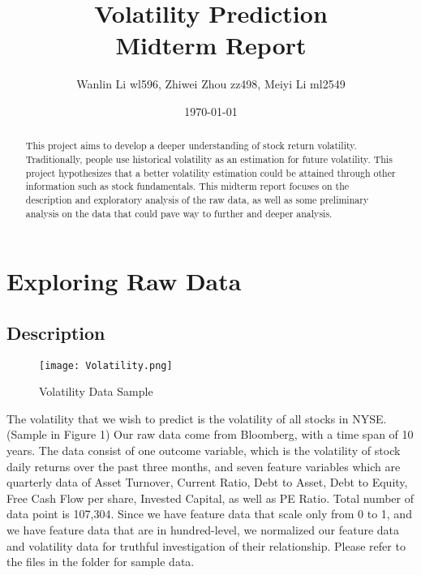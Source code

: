 \documentclass[a4paper]{article}
\title{Volatility Prediction\\Midterm Report}
\author{Wanlin Li wl596, Zhiwei Zhou zz498, Meiyi Li ml2549}
\date{\today}
\begin{document}
\maketitle  

\begin{abstract}
This project aims to develop a deeper understanding of stock return volatility. Traditionally, people use historical volatility as an estimation for future volatility. This project hypothesizes that a better volatility estimation could be attained through other information such as stock fundamentals. This midterm report focuses on the description and exploratory analysis of the raw data, as well as some preliminary analysis on the data that could pave way to further and deeper analysis.
\end{abstract}

\section{Exploring Raw Data}
\label{sec:introduction}

\subsection{Description}

\begin{figure}[h]
\centering
\texttt{[image: Volatility.png]}
\caption{\label{fig:scatter plot}Volatility Data Sample}
\end{figure}

The volatility that we wish to predict is the volatility of all stocks in NYSE. (Sample in Figure 1) Our raw data come from Bloomberg, with a time span of 10 years. The data consist of one outcome variable, which is the volatility of stock daily returns over the past three months, and seven feature variables which are quarterly data of Asset Turnover, Current Ratio, Debt to Asset, Debt to Equity, Free Cash Flow per share, Invested Capital, as well as PE Ratio. Total number of data point is 107,304. Since we have feature data that scale only from 0 to 1, and we have feature data that are in hundred-level, we normalized our feature data and volatility data for truthful investigation of their relationship. Please refer to the files in the folder for sample data.
\end{document}
